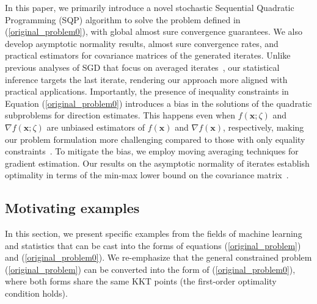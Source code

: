 \documentclass[aos]{imsart}
\numberwithin{equation}{section}
\theoremstyle{plain}
\begin{document}
In this paper, we primarily introduce a novel stochastic Sequential Quadratic Programming (SQP) algorithm to solve the problem defined in (\ref{original_problem0}), with global almost sure convergence guarantees.
We also develop asymptotic normality results, almost sure convergence rates, and practical estimators for covariance matrices of the generated iterates.
Unlike previous analyses of SGD that focus on averaged iterates~\cite{polyak1992acceleration, chen2020statistical}, our statistical inference targets the last iterate, rendering our approach more aligned with practical applications.
Importantly, the presence of inequality constraints in Equation (\ref{original_problem0}) introduces a bias in the solutions of the quadratic subproblems for direction estimates. This happens even when $f(\bm{x}; \zeta)$ and $\nabla f(\bm{x}; \zeta)$ are unbiased estimators of $f(\bm{x})$ and $\nabla f(\bm{x})$, respectively, making our problem formulation more challenging compared to those with only equality constraints~\cite{berahas2021sequential, na2022asymptotic}. To mitigate the bias, we employ moving averaging techniques for gradient estimation. Our results on the asymptotic normality of iterates establish optimality in terms of the min-max lower bound on the covariance matrix~\cite{duchi2021asymptotic}.



\subsection{Motivating examples}
In this section, we present specific examples from the fields of machine learning and statistics that can be cast into the forms of equations (\ref{original_problem}) and (\ref{original_problem0}). We re-emphasize that the general constrained problem (\ref{original_problem}) can be converted into the form of (\ref{original_problem0}), where both forms share the same KKT points (the first-order optimality condition holds). 
\end{document}
